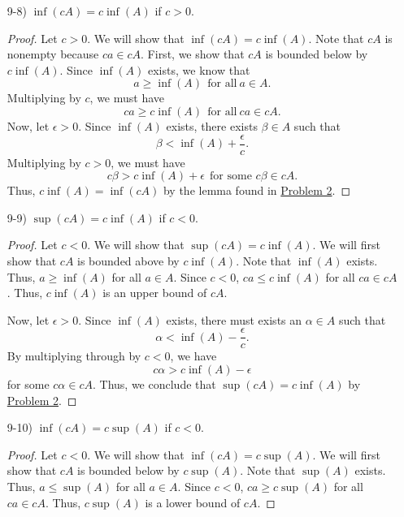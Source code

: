 \documentclass[11pt,a4paper]{article}
\begin{document}
\begin{enumerate}
\begin{enumerate}
\begin{proof}
               \end{proof} 
        \item[9-8)] \( \inf(cA) = c \inf (A)  \) if \( c > 0  \).
            \begin{proof}
    Let \( c > 0  \). We will show that \( \inf(cA) = c \inf(A) \). Note that \( cA  \) is nonempty because \( ca \in cA  \). First, we show that \( cA  \) is bounded below by \( c \inf(A) \). Since \( \inf(A) \) exists, we know that  
                   \[  a \geq \inf(A) \ \ \text{for all} \ a \in A.   \]
                   Multiplying by \( c  \), we must have
                   \[  ca \geq c \inf(A) \ \ \text{for all} \  ca \in cA. \]
                   Now, let \( \epsilon > 0 \). Since \( \inf(A)  \) exists, there exists \( \beta \in A  \) such that   
                   \[  \beta < \inf(A) + \frac{ \epsilon }{ c }.  \]
                   Multiplying by \( c > 0  \), we must have
                   \[  c \beta > c \inf(A) + \epsilon \ \ \text{for some } c \beta \in cA.   \]
                   Thus, \( c \inf(A) = \inf(cA) \) by the lemma found in {\hyperref[Problem 2]{Problem 2}}. 
            \end{proof}
        \item[9-9)] \( \sup(cA) = c \inf(A) \) if \( c < 0  \).
            \begin{proof}
            Let \( c < 0  \). We will show that \( \sup(cA) = c \inf(A) \). We will first show that \( cA  \) is bounded above by \( c \inf (A) \). Note that \( \inf(A) \) exists. Thus, \( a \geq \inf(A) \) for all \( a \in A  \). Since \( c < 0  \), \( ca \leq c \inf(A)  \) for all \( ca \in cA  \). Thus, \( c \inf(A) \) is an upper bound of \( cA \).
           
            Now, let \( \epsilon > 0 \). Since \( \inf(A) \) exists, there must exists an \( \alpha \in A  \) such that  
            \[  \alpha < \inf(A) - \frac{ \epsilon }{ c }. \]
            By multiplying through by \( c < 0  \), we have
            \[  c \alpha > c \inf(A) - \epsilon \]
            for some \( c \alpha \in cA  \). Thus, we conclude that \( \sup(cA) = c \inf(A) \) by {\hyperref[Problem 2]{Problem 2}}.
            \end{proof}
        \item[9-10)] \( \inf(cA) = c \sup (A) \) if \( c < 0  \).
            \begin{proof}
            Let \( c < 0  \). We will show that \( \inf(cA) = c \sup(A) \). We will first show that \( cA  \) is bounded below by \( c \sup (A) \). Note that \( \sup(A) \) exists. Thus, \( a \leq \sup(A) \) for all \( a \in A  \). Since \( c < 0  \), \( ca \geq c \sup(A)  \) for all \( ca \in cA  \). Thus, \( c \sup(A) \) is a lower bound of \( cA \).
           

\end{proof}
\end{enumerate}
\end{enumerate}
\end{document}
